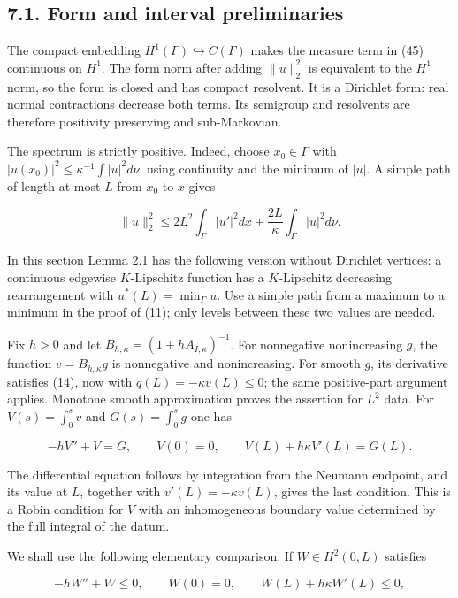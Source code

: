 \documentclass[11pt]{article}
\begin{document}
\subsection{7.1. Form and interval
preliminaries}\label{form-and-interval-preliminaries}

The compact embedding \(H^1(\Gamma)\hookrightarrow C(\Gamma)\) makes the
measure term in (45) continuous on \(H^1\). The form norm after adding
\(\|u\|_2^2\) is equivalent to the \(H^1\) norm, so the form is closed
and has compact resolvent. It is a Dirichlet form: real normal
contractions decrease both terms. Its semigroup and resolvents are
therefore positivity preserving and sub-Markovian.

The spectrum is strictly positive. Indeed, choose \(x_0\in\Gamma\) with
\(|u(x_0)|^2\le\kappa^{-1}\int|u|^2d\nu\), using continuity and the
minimum of \(|u|\). A simple path of length at most \(L\) from \(x_0\)
to \(x\) gives

\[
\|u\|_2^2\le 2L^2\int_\Gamma|u'|^2dx
+\frac{2L}{\kappa}\int_\Gamma|u|^2d\nu.
\tag{49}
\]

In this section Lemma 2.1 has the following version without Dirichlet
vertices: a continuous edgewise \(K\)-Lipschitz function has a
\(K\)-Lipschitz decreasing rearrangement with \(u^*(L)=\min_\Gamma u\).
Use a simple path from a maximum to a minimum in the proof of (11); only
levels between these two values are needed.

Fix \(h>0\) and let \(B_{h,\kappa}=(1+hA_{I,\kappa})^{-1}\). For
nonnegative nonincreasing \(g\), the function \(v=B_{h,\kappa}g\) is
nonnegative and nonincreasing. For smooth \(g\), its derivative
satisfies (14), now with \(q(L)=-\kappa v(L)\le0\); the same
positive-part argument applies. Monotone smooth approximation proves the
assertion for \(L^2\) data. For \(V(s)=\int_0^s v\) and
\(G(s)=\int_0^s g\) one has

\[
-hV''+V=G,\qquad V(0)=0,
\qquad V(L)+h\kappa V'(L)=G(L).
\tag{50}
\]

The differential equation follows by integration from the Neumann
endpoint, and its value at \(L\), together with \(v'(L)=-\kappa v(L)\),
gives the last condition. This is a Robin condition for \(V\) with an
inhomogeneous boundary value determined by the full integral of the
datum.

We shall use the following elementary comparison. If \(W\in H^2(0,L)\)
satisfies

\[
-hW''+W\le0,\qquad W(0)=0,
\qquad W(L)+h\kappa W'(L)\le0,
\tag{51}
\]
\end{document}

